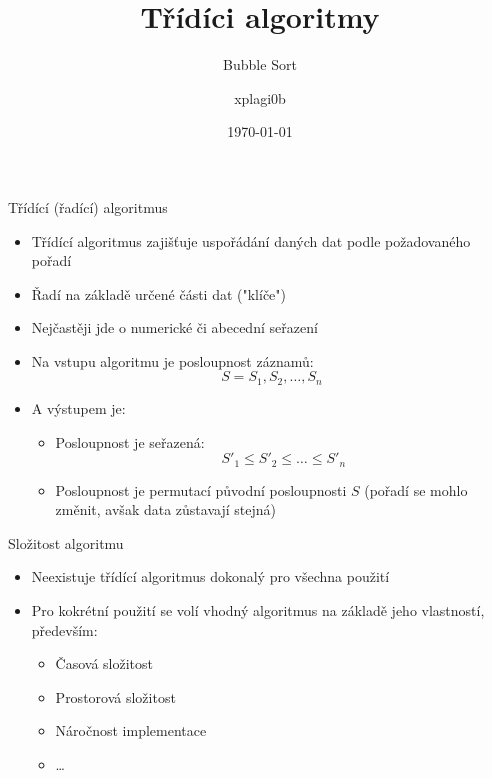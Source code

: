 \documentclass[10pt]{beamer}
\title{Třídíci algoritmy}
\subtitle{Bubble Sort}
\author{xplagi0b}
\date{\today}
\begin{document}
\maketitle
\begin{frame}{Třídící (řadící) algoritmus}
    \begin{itemize}
    \item Třídící algoritmus zajišťuje uspořádání daných dat podle požadovaného pořadí
    \item Řadí na základě určené části dat ("klíče")
    \item Nejčastěji jde o numerické či abecední seřazení
    \pause
    \item Na vstupu algoritmu je posloupnost záznamů:
    $$S = S_1, S_2, \dots, S_n$$
    \pause
        \item A výstupem je:
        
        \begin{itemize}
            \item Posloupnost je seřazená:
            $$S'_1 \leq S'_2 \leq \dots \leq S'_n$$
            \item Posloupnost je permutací původní posloupnosti $S$ (pořadí se mohlo změnit, avšak data zůstavají stejná)
        \end{itemize}
    \end{itemize}
\end{frame}

\begin{frame}{Složitost algoritmu}
    \begin{itemize}
        \item Neexistuje třídící algoritmus dokonalý pro všechna použití
        \item Pro kokrétní použití se volí vhodný algoritmus na základě jeho vlastností, především:
        \begin{itemize}
            \item Časová složitost
            \item Prostorová složitost
            \item Náročnost implementace
            \item \dots
        \end{itemize}
    \end{itemize}
\end{frame}
\end{document}
